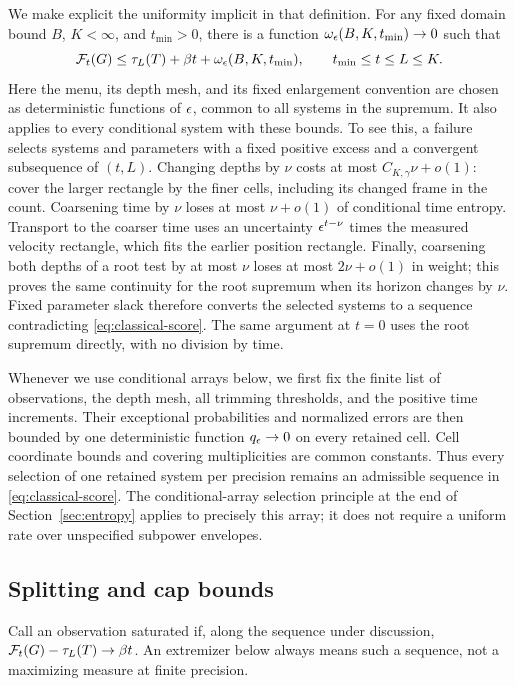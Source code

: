 We make explicit the uniformity implicit in that definition.  For any
fixed domain bound $B$, $K<\infty$, and $t_{\min}>0$, there is a function
$\omega_\epsilon(B,K,t_{\min})\to0$ such that
\begin{equation}
 \mathcal F_t(G)\le\tau_L(T)+\beta t+
 \omega_\epsilon(B,K,t_{\min}),\qquad t_{\min}\le t\le L\le K.
 \label{eq:classical-uniform}
\end{equation}
Here the menu, its depth mesh, and its fixed enlargement convention are
chosen as deterministic functions of $\epsilon$, common to all systems in
the supremum.  It also applies to every conditional system with these
bounds.  To see
this, a failure selects systems and parameters with a fixed positive
excess and a convergent subsequence of $(t,L)$.  Changing depths by $\nu$
costs at most $C_{K,\gamma}\nu+o(1)$: cover the larger rectangle by the
finer cells, including its changed frame in the count.  Coarsening time
by $\nu$ loses at most $\nu+o(1)$ of conditional time entropy.  Transport
to the coarser time uses an uncertainty $\epsilon^{t-\nu}$ times the measured
velocity rectangle, which fits the earlier position rectangle.  Finally,
coarsening both depths of a root test by at most $\nu$ loses at most
$2\nu+o(1)$ in weight; this proves the same continuity for the root
supremum when its horizon changes by $\nu$.  Fixed parameter slack
therefore converts the selected systems to a sequence contradicting
\eqref{eq:classical-score}.  The same argument at $t=0$ uses the root
supremum directly, with no division by time.

Whenever we use conditional arrays below, we first fix the finite list
of observations, the depth mesh, all trimming thresholds, and the
positive time increments.  Their exceptional probabilities and
normalized errors are then bounded by one deterministic function
$q_\epsilon\to0$ on every retained cell.  Cell coordinate bounds and
covering multiplicities are common constants.  Thus every selection
of one retained system per precision remains an admissible sequence
in \eqref{eq:classical-score}.  The conditional-array selection principle at the end of
Section~\ref{sec:entropy} applies to precisely this array; it does
not require a uniform rate over unspecified subpower envelopes.

\subsection{Splitting and cap bounds}

Call an observation saturated if, along the sequence under discussion,
$\mathcal F_t(G)-\tau_L(T)\to\beta t$.  An extremizer below always means
such a sequence, not a maximizing measure at finite precision.

